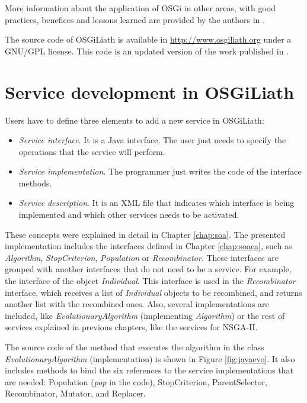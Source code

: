 More information about the application of OSGi in other areas, with good practices, benefices and lessons learned are provided by the authors in \cite{GarciaSanchez2013Gateway}.



The source code of OSGiLiath is available in \url{http://www.osgiliath.org} under a GNU/GPL license. This code is an updated version of the work published in \cite{GarciaSanchezDistributed2010}. 

 
\section{Service development in OSGiLiath}

Users have to define three elements to add a new service in OSGiLiath:


\begin{itemize}
\item {\em Service interface}. It is a Java interface. The user just needs to specify the operations that the service will perform.
\item {\em Service implementation}. The programmer just writes the code of the interface methods.
\item {\em Service description}. It is an XML file that indicates which
  interface is being implemented and which other services needs to be
  activated. 
\end{itemize}
These concepts were explained in detail in Chapter \ref{chap:soa}.
The presented implementation includes the interfaces defined in Chapter \ref{chap:soaea}, such as {\em Algorithm}, {\em StopCriterion}, {\em Population} or {\em Recombinator}. These interfaces are grouped with another interfaces that do not need to be a service. For example, the interface of the object {\em Individual}. This interface is used in the {\em Recombinator} interface, which receives a list of {\em Individual} objects to be recombined, and returns another list with the recombined ones.
Also, several implementations are included, like {\em EvolutionaryAlgorithm} (implementing {\em  Algorithm}) or the rest of  services explained in previous chapters, like the services for NSGA-II.


The source code of the method that executes the algorithm in the class {\em EvolutionaryAlgorithm} (implementation) is shown in Figure \ref{fig:javaevo}. It also includes methods to bind the six references to the service implementations that are needed: Population ({\em pop} in the code), StopCriterion, ParentSelector, Recombinator, Mutator, and Replacer. 


